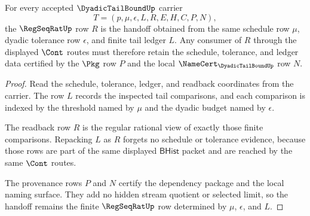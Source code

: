 \begin{theorem}
\label{thm:dyadic-tail-bound-regseqrat-handoff-exactness}
For every accepted $\DyadicTailBoundUp$ carrier
$$
T=(p,\mu,\epsilon,L,R,E,H,C,P,N),
$$
the $\RegSeqRatUp$ row $R$ is the handoff obtained from the same schedule row $\mu$, dyadic tolerance row $\epsilon$, and finite tail ledger $L$. Any consumer of $R$ through the displayed $\Cont$ routes must therefore retain the schedule, tolerance, and ledger data certified by the $\Pkg$ row $P$ and the local $\NameCert_{\DyadicTailBoundUp}$ row $N$.
\end{theorem}
\begin{proof}
Read the schedule, tolerance, ledger, and readback coordinates from the carrier. The row $L$ records the inspected tail comparisons, and each comparison is indexed by the threshold named by $\mu$ and the dyadic budget named by $\epsilon$.

The readback row $R$ is the regular rational view of exactly those finite comparisons. Repacking $L$ as $R$ forgets no schedule or tolerance evidence, because those rows are part of the same displayed $\mathsf{BHist}$ packet and are reached by the same $\Cont$ routes.

The provenance rows $P$ and $N$ certify the dependency package and the local naming surface. They add no hidden stream quotient or selected limit, so the handoff remains the finite $\RegSeqRatUp$ row determined by $\mu$, $\epsilon$, and $L$.
\end{proof}

